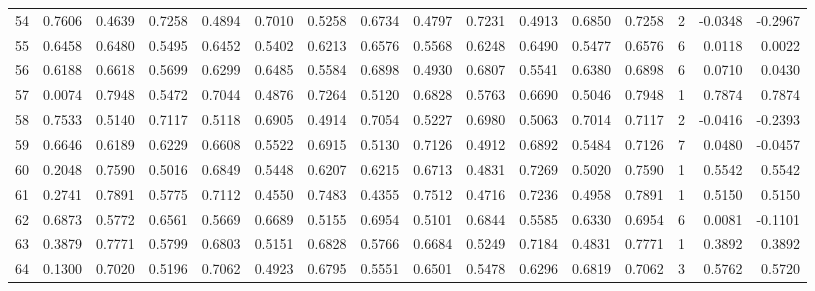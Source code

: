 \begin{tabular}{lrrrrrrrrrrrrrrr}
54  &      0.7606 &  0.4639 &  0.7258 &  0.4894 &  0.7010 &  0.5258 &  0.6734 &  0.4797 &  0.7231 &  0.4913 &   0.6850 &     0.7258 &      2 &                   -0.0348 &                    -0.2967 \\
55  &      0.6458 &  0.6480 &  0.5495 &  0.6452 &  0.5402 &  0.6213 &  0.6576 &  0.5568 &  0.6248 &  0.6490 &   0.5477 &     0.6576 &      6 &                    0.0118 &                     0.0022 \\
56  &      0.6188 &  0.6618 &  0.5699 &  0.6299 &  0.6485 &  0.5584 &  0.6898 &  0.4930 &  0.6807 &  0.5541 &   0.6380 &     0.6898 &      6 &                    0.0710 &                     0.0430 \\
57  &      0.0074 &  0.7948 &  0.5472 &  0.7044 &  0.4876 &  0.7264 &  0.5120 &  0.6828 &  0.5763 &  0.6690 &   0.5046 &     0.7948 &      1 &                    0.7874 &                     0.7874 \\
58  &      0.7533 &  0.5140 &  0.7117 &  0.5118 &  0.6905 &  0.4914 &  0.7054 &  0.5227 &  0.6980 &  0.5063 &   0.7014 &     0.7117 &      2 &                   -0.0416 &                    -0.2393 \\
59  &      0.6646 &  0.6189 &  0.6229 &  0.6608 &  0.5522 &  0.6915 &  0.5130 &  0.7126 &  0.4912 &  0.6892 &   0.5484 &     0.7126 &      7 &                    0.0480 &                    -0.0457 \\
60  &      0.2048 &  0.7590 &  0.5016 &  0.6849 &  0.5448 &  0.6207 &  0.6215 &  0.6713 &  0.4831 &  0.7269 &   0.5020 &     0.7590 &      1 &                    0.5542 &                     0.5542 \\
61  &      0.2741 &  0.7891 &  0.5775 &  0.7112 &  0.4550 &  0.7483 &  0.4355 &  0.7512 &  0.4716 &  0.7236 &   0.4958 &     0.7891 &      1 &                    0.5150 &                     0.5150 \\
62  &      0.6873 &  0.5772 &  0.6561 &  0.5669 &  0.6689 &  0.5155 &  0.6954 &  0.5101 &  0.6844 &  0.5585 &   0.6330 &     0.6954 &      6 &                    0.0081 &                    -0.1101 \\
63  &      0.3879 &  0.7771 &  0.5799 &  0.6803 &  0.5151 &  0.6828 &  0.5766 &  0.6684 &  0.5249 &  0.7184 &   0.4831 &     0.7771 &      1 &                    0.3892 &                     0.3892 \\
64  &      0.1300 &  0.7020 &  0.5196 &  0.7062 &  0.4923 &  0.6795 &  0.5551 &  0.6501 &  0.5478 &  0.6296 &   0.6819 &     0.7062 &      3 &                    0.5762 &                     0.5720 \\

\end{tabular}
